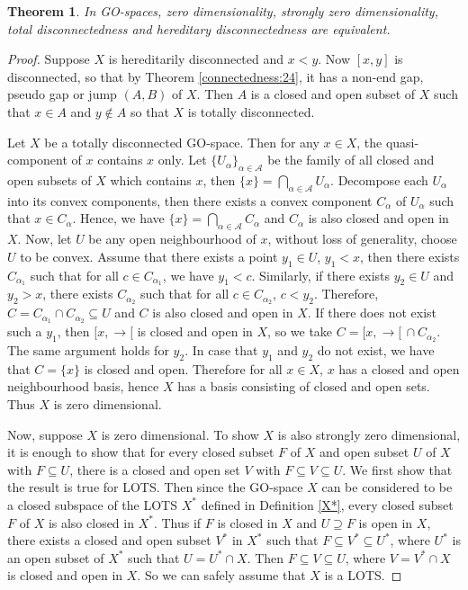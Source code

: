 \documentclass[12pt,oneside,english]{amsbook}
\numberwithin{equation}{section} %
\numberwithin{figure}{section} %
\theoremstyle{plain}
\numberwithin{section}{chapter}
\newtheorem{thm}{Theorem}[section]
\theoremstyle{plain}
\begin{document}
\begin{thm}\label{connectedness:23}
  In GO-spaces, zero dimensionality, strongly zero dimensionality, total disconnectedness and hereditary disconnectedness are equivalent.
\end{thm}
\begin{proof}
  Suppose $X$ is hereditarily disconnected and $x < y$. Now $[x,y]$ is disconnected, so that by Theorem \ref{connectedness:24}, it has a non-end gap, pseudo gap or jump $(A,B)$ of $X$. Then $A$ is a closed and open subset of $X$ such that $x \in A$ and $y \notin A$ so that $X$ is totally disconnected. 
  
  Let $X$ be a totally disconnected GO-space. Then for any $x \in X$, the quasi-component of $x$ contains $x$ only. Let $\{U_{\alpha}\}_{\alpha \in \mathcal{A}}$ be the family of all closed and open subsets of $X$ which contains $x$, then $\{x\} = \bigcap_{\alpha \in \mathcal{A}}U_{\alpha}$. Decompose each $U_{\alpha}$ into its convex components, then there exists a convex component $C_{\alpha}$ of $U_{\alpha}$ such that $x \in C_{\alpha}$. Hence, we have $\{x\} = \bigcap_{\alpha \in \mathcal{A}}C_{\alpha}$ and $C_{\alpha}$ is also closed and open in $X$. Now, let $U$ be any open neighbourhood of $x$, without loss of generality, choose $U$ to be convex. Assume that there exists a point $y_{1} \in U$, $y_{1} < x$, then there exists $C_{\alpha_{1}}$ such that for all $c \in C_{\alpha_{1}}$, we have $y_{1} < c$. Similarly, if there exists $y_{2} \in U$ and $y_{2} > x$, there exists $C_{\alpha_{2}}$ such that for all $c \in C_{\alpha_{2}}$, $c < y_{2}$. Therefore, $C = C_{\alpha_{1}} \cap C_{\alpha_2} \subseteq U$ and $C$ is also closed and open in $X$. If there does not exist such a $y_1$, then $[x, \rightarrow[$ is closed and open in $X$, so we take $C = [x, \rightarrow[ \, \cap C_{\alpha_2}$. The same argument holds for $y_2$. In case that $y_1$ and $y_2$ do not exist, we have that $C = \{x\}$ is closed and open. Therefore for all $x \in X$, $x$ has a closed and open neighbourhood basis, hence $X$ has a basis consisting of closed and open sets. Thus $X$ is zero dimensional.

  
  Now, suppose $X$ is zero dimensional. To show $X$ is also strongly zero dimensional, it is enough to show that for every closed subset $F$ of $X$ and open subset $U$ of $X$ with $F \subseteq U$, there is a closed and open set $V$ with $F \subseteq V \subseteq U$. We first show that the result is true for LOTS. Then since the GO-space $X$ can be considered to be a closed subspace of the LOTS $X^*$ defined in Definition \ref{X*}, every closed subset $F$ of $X$ is also closed in $X^*$. Thus if $F$ is closed in $X$ and $U \supseteq F$ is open in $X$, there exists a closed and open subset $V^*$ in $X^*$ such that $F \subseteq V^* \subseteq U^*$, where $U^*$ is an open subset of $X^*$ such that $U = U^* \cap X$. Then $F \subseteq V \subseteq U$, where $V = V^* \cap X$ is closed and open in $X$. So we can safely assume that $X$ is a LOTS. 


\end{proof}
\end{document}
